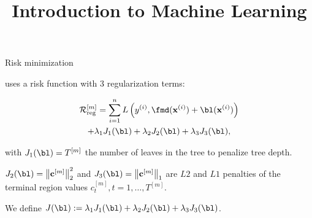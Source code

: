 \documentclass[11pt,compress,t,notes=noshow, xcolor=table]{beamer}
\title{Introduction to Machine Learning}
\begin{document}

\begin{vbframe}{Risk minimization}

     uses a risk function with 3 regularization terms:

    \begin{multline*}
      \riskr^{[m]} = \sum_{i=1}^{n} L\left(\yi, \fmd(\xi) + \bl(\xi)\right)\\
       + \lambda_1 J_1(\bl) + \lambda_2 J_2(\bl) + \lambda_3 J_3(\bl),
    \end{multline*}

    \lz

    with $J_1(\bl) = T^{[m]}$ the number of leaves in the tree to penalize tree depth.

    \lz

    $J_2(\bl) = \left\|\mathbf{c}^{[m]}\right\|^2_2$ and $J_3(\bl) = \left\|\mathbf{c}^{[m]}\right\|_1$ are $L2$ and $L1$ penalties of the terminal region values $c_t^{[m]}, t=1,\dots,T^{[m]}$.

    \lz

    We define $J(\bl) := \lambda_1 J_1(\bl) + \lambda_2 J_2(\bl) + \lambda_3 J_3(\bl)$.

    \framebreak









\end{vbframe}
\end{document}
